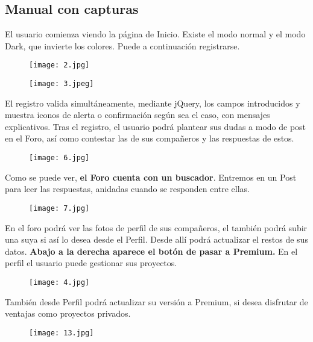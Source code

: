 \documentclass[12pt]{report}
\begin{document}
\subsection{Manual con capturas}
El usuario comienza viendo la página de Inicio. Existe el modo normal y el modo Dark, que invierte los colores. Puede a continuación registrarse. 

\begin{figure}[h]
 \centering
  \texttt{[image: 2.jpg]}
\end{figure}

\begin{figure}[!h]
 \centering
  \texttt{[image: 3.jpeg]}
\end{figure}

El registro valida simultáneamente, mediante jQuery, los campos introducidos y muestra iconos de alerta o confirmación según sea el caso, con mensajes explicativos. Tras el registro, el usuario podrá plantear sus dudas a modo de post en el Foro, así como contestar las de sus compañeros y las respuestas de estos. 

\begin{figure}[!h]
 \centering
  \texttt{[image: 6.jpg]}
\end{figure}

Como se puede ver, \textbf{el Foro cuenta con un buscador}. Entremos en un Post para leer las respuestas, anidadas cuando se responden entre ellas.

\begin{figure}[!h]
 \centering
  \texttt{[image: 7.jpg]}
\end{figure}

En el foro podrá ver las fotos de perfil de sus compañeros, el también podrá subir una suya si así lo desea desde el Perfil. Desde allí podrá actualizar el restos de sus datos. \textbf{Abajo a la derecha aparece el botón de pasar a Premium.} En el perfil el usuario puede gestionar sus proyectos.

\begin{figure}[!h]
 \centering
  \texttt{[image: 4.jpg]}
\end{figure}

También desde Perfil podrá actualizar su versión a Premium, si desea disfrutar de ventajas como proyectos privados.

\begin{figure}[!h]
 \centering
  \texttt{[image: 13.jpg]}
\end{figure}
\end{document}
